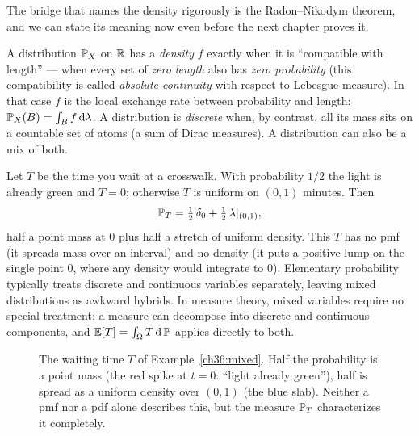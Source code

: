 The bridge that names the density rigorously is the Radon--Nikodym theorem, and we
can state its meaning now even before the next chapter proves it.

\begin{focusbox}
A distribution $\P_X$ on $\R$ has a \emph{density} $f$ exactly when it is
``compatible with length'' --- when every set of \emph{zero length} also has
\emph{zero probability} (this compatibility is called \emph{absolute continuity}
with respect to Lebesgue measure). In that case $f$ is the local exchange rate
between probability and length: $\P_X(B) = \int_B f\,\dd\lambda$. A distribution is
\emph{discrete} when, by contrast, all its mass sits on a countable set of atoms
(a sum of Dirac measures). A distribution can also be a mix of both.
\end{focusbox}

\begin{example}
\label{ch36:mixed}
Let $T$ be the time you wait at a crosswalk. With probability $1/2$ the light is
already green and $T = 0$; otherwise $T$ is uniform on $(0,1)$ minutes. Then
\[
  \P_T = \tfrac{1}{2}\,\delta_0 + \tfrac{1}{2}\,\lambda|_{(0,1)},
\]
half a point mass at $0$ plus half a stretch of uniform density. This $T$ has no
pmf (it spreads mass over an interval) and no density (it puts a positive lump on
the single point $0$, where any density would integrate to $0$). Elementary
probability typically treats discrete and continuous variables separately, leaving
mixed distributions as awkward hybrids. In measure theory, mixed variables require
no special treatment: a measure can decompose into discrete and continuous components,
and $\E[T] = \int_{\Omega} T\,\dd\P$ applies directly to both.
\end{example}

\begin{figure}[H]
\centering
{}
\caption{The waiting time $T$ of Example~\ref{ch36:mixed}. Half the probability
is a point mass (the red spike at $t=0$: ``light already green''), half is spread
as a uniform density over $(0,1)$ (the blue slab). Neither a pmf nor a pdf alone
describes this, but the measure $\P_T$ characterizes it completely.}
\label{ch36:fig-mixed}
\end{figure}

